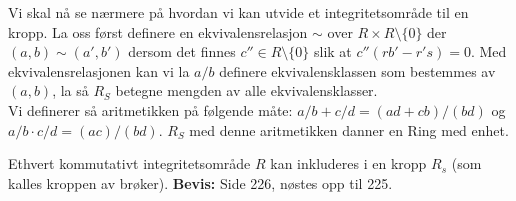 Vi skal nå se nærmere på hvordan vi kan utvide et integritetsområde til en kropp.
La oss først definere en ekvivalensrelasjon $\sim$ over $R \times R \setminus \{0\}$ der $(a,b) \sim (a', b')$ dersom det finnes $c'' \in R \setminus \{0\}$ slik at $c''(rb' - r's) = 0$. Med ekvivalensrelasjonen kan vi la $a/b$ definere ekvivalensklassen som bestemmes av $(a,b)$, la så $R_S$ betegne mengden av alle ekvivalensklasser. \\

 Vi definerer så aritmetikken på følgende måte: $a/b + c/d = (ad + cb)/(bd)$ og $a/b \cdot c/d = (ac)/(bd)$. $R_S$ med denne aritmetikken danner en Ring med enhet. 
 
 \begin{teorem}
 Ethvert kommutativt integritetsområde $R$ kan inkluderes i en kropp $R_s$ (som kalles kroppen av brøker). 
 \textbf{Bevis:} Side 226, nøstes opp til 225.
 \end{teorem}